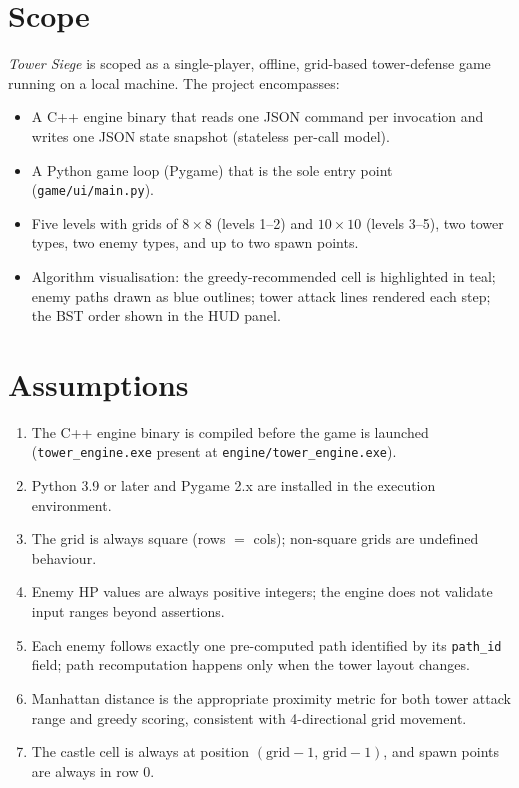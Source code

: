 \documentclass[12pt,a4paper]{report}
\begin{document}
\chapter{Scope}
\label{ch:scope}

\textit{Tower Siege} is scoped as a single-player, offline, grid-based
tower-defense game running on a local machine.
The project encompasses:

\begin{itemize}
  \item A C++ engine binary that reads one JSON command per invocation and
        writes one JSON state snapshot (stateless per-call model).
  \item A Python game loop (Pygame) that is the sole entry point
        (\texttt{game/ui/main.py}).
  \item Five levels with grids of $8 \times 8$ (levels 1--2) and
        $10 \times 10$ (levels 3--5), two tower types, two enemy types,
        and up to two spawn points.
  \item Algorithm visualisation: the greedy-recommended cell is highlighted
        in teal; enemy paths drawn as blue outlines; tower attack lines
        rendered each step; the BST order shown in the HUD panel.
\end{itemize}



\chapter{Assumptions}
\label{ch:assumptions}

\begin{enumerate}
  \item The C++ engine binary is compiled before the game is launched
        (\texttt{tower\_engine.exe} present at \texttt{engine/tower\_engine.exe}).
  \item Python 3.9 or later and Pygame 2.x are installed in the execution
        environment.
  \item The grid is always square (rows $=$ cols); non-square grids are
        undefined behaviour.
  \item Enemy HP values are always positive integers; the engine does not
        validate input ranges beyond assertions.
  \item Each enemy follows exactly one pre-computed path identified by its
        \texttt{path\_id} field; path recomputation happens only when the
        tower layout changes.
  \item Manhattan distance is the appropriate proximity metric for both
        tower attack range and greedy scoring, consistent with 4-directional
        grid movement.
  \item The castle cell is always at position $(\text{grid} - 1,\,
        \text{grid} - 1)$, and spawn points are always in row 0.
\end{enumerate}
\end{document}
